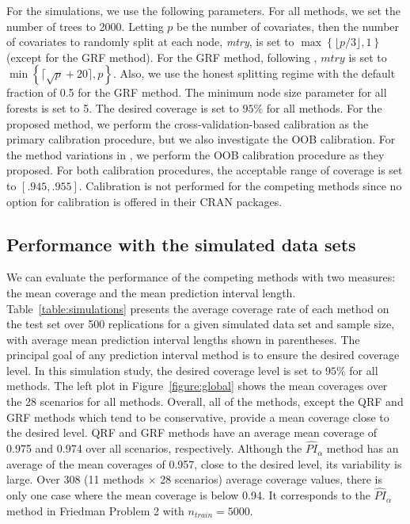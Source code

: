For the simulations, we use the following parameters. For all methods, we set the number of trees to 2000. Letting $p$ be the number of covariates, then the number of covariates to randomly split at each node, \emph{mtry}, is set to $\max\left \{\lfloor p/3 \rfloor,1\right \}$ (except for the GRF method). For the GRF method, following \citet{athey_generalized_2019}, $mtry$ is set to $\min\left \{\lceil \sqrt{p}+20 \rceil,p\right \}$. Also, we use the honest splitting regime with the default fraction of 0.5 for the GRF method. The minimum node size parameter for all forests is set to 5. The desired coverage is set to $95\%$ for all methods. For the proposed method, we perform the cross-validation-based calibration as the primary calibration procedure, but we also investigate the OOB calibration. For the method variations in \citet{roy_prediction_2020}, we perform the OOB calibration procedure as they proposed. For both calibration procedures, the acceptable range of coverage is set to $\left[.945,.955\right]$. Calibration is not performed for the competing methods since no option for calibration is offered in their CRAN packages.

\subsection{Performance with the simulated data sets}

We can evaluate the performance of the competing methods with two measures: the mean coverage and the mean prediction interval length. Table~\ref{table:simulations} presents the average coverage rate of each method on the test set over 500 replications for a given simulated data set and sample size, with average mean prediction interval lengths shown in parentheses. The principal goal of any prediction interval method is to ensure the desired coverage level. In this simulation study, the desired coverage level is set to $95\%$ for all methods. The left plot in Figure~\ref{figure:global} shows the mean coverages over the 28 scenarios for all methods. Overall, all of the methods, except the QRF and GRF methods which tend to be conservative, provide a mean coverage close to the desired level. QRF and GRF methods have an average mean coverage of 0.975 and 0.974 over all scenarios, respectively. Although the $\widehat{PI}_\alpha$ method has an average of the mean coverages of 0.957, close to the desired level, its variability is large. Over 308 (11 methods $\times$ 28 scenarios) average coverage values, there is only one case where the mean coverage is below 0.94. It corresponds to the $\widehat{PI}_\alpha$ method in Friedman Problem 2 with $n_{train}=5000$.

